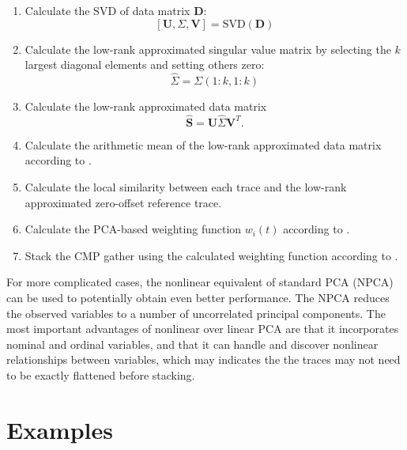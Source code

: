 \begin{enumerate}
\item Calculate the SVD of data matrix $\mathbf{D}$:
\begin{equation}
\label{eq:svd}
[\mathbf{U},\Sigma,\mathbf{V}]=\text{SVD}(\mathbf{D})
\end{equation}
\item Calculate the low-rank approximated singular value matrix by selecting the $k$ largest diagonal elements and setting others zero:
\begin{equation}
\label{eq:singular}
\hat{\Sigma} = \Sigma(1:k,1:k)
\end{equation}
\item Calculate the low-rank approximated data matrix
\begin{equation}
\label{eq:lr}
\hat{\mathbf{S}} = \mathbf{U}\hat{\Sigma}\mathbf{V}^T.
\end{equation}
\item Calculate the arithmetic mean of the low-rank approximated data matrix according to \wen{(\ref{eq:ave})}.
\item Calculate the local similarity between each trace and the low-rank approximated zero-offset reference trace.
\item Calculate the PCA-based weighting function $w_i(t)$ according to \wen{(\ref{eq:weight1})}.
\item Stack the CMP gather using the calculated weighting function according to \wen{(\ref{eq:simistack})}.
\end{enumerate}
For more complicated cases, the nonlinear equivalent of standard PCA (NPCA) can be used to potentially obtain even better performance. The NPCA reduces the observed variables to a number of uncorrelated principal components. The most important advantages of nonlinear over linear PCA are that it incorporates nominal and ordinal variables, and that it can handle and discover nonlinear relationships between variables, which may indicates the the traces may not need to be exactly flattened before stacking.

\section{Examples}

